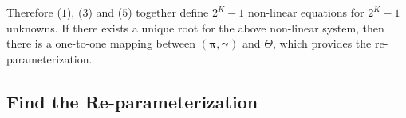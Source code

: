 \documentclass[11 pt, a4paper]{article}  %
\begin{document}
Therefore ($1$), ($3$) and ($5$) together define $2^K-1$ non-linear equations for $2^K-1$ unknowns. If there exists a unique root for the above non-linear system, then there is a one-to-one mapping between $(\boldsymbol\pi, \boldsymbol\gamma)$ and $\Theta$, which provides the re-parameterization.

\subsection{Find the Re-parameterization}


%
\end{document}
